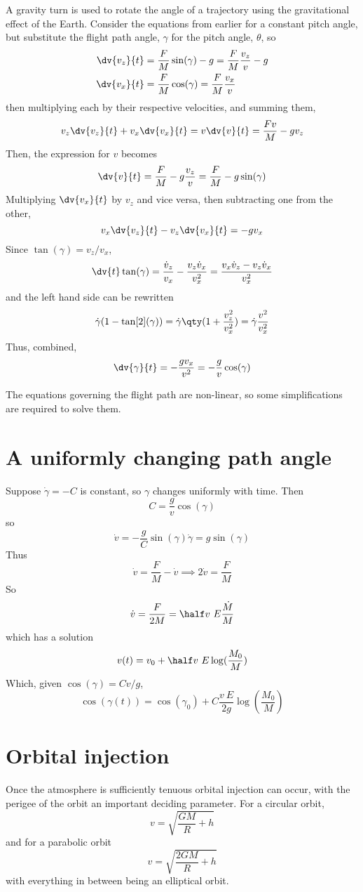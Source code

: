 A gravity turn is used to rotate the angle of a trajectory using the
gravitational effect of the Earth. Consider the equations from earlier for a constant pitch angle, but substitute the flight path angle, $\gamma$ for the pitch angle, $\theta$, so
\begin{align*}
  \dv{v_z}{t} &= \frac{F}{M} \sin(\gamma) - g = \frac{F}{M} \frac{v_z}{v} -g \\
\dv{v_x}{t} &= \frac{F}{M} \cos(\gamma) =\frac{F}{M} \frac{v_x}{v}
\end{align*}
then multiplying each by their respective velocities, and summing them,
\[ v_z \dv{v_z}{t} + v_x \dv{v_x}{t} = v \dv{v}{t} = \frac{F v}{M} - gv_z \]
Then, the expression for $v$ becomes
\[ \dv{v}{t} = \frac{F}{M} - g \frac{v_z}{v} = \frac{F}{M} - g \sin(\gamma) \]
Multiplying $\dv{v_x}{t}$ by $v_z$ and vice versa, then subtracting one from the other,
\[ v_x \dv{v_z}{t} - v_z \dv{v_x}{t} = - g v_x \]
Since $\tan(\gamma) = v_z / v_x$,
\[ \dv{t} \tan(\gamma) = \frac{\dot{v}_z}{v_x} - \frac{v_z \dot{v}_x}{v_x^2} = \frac{v_x \dot{v}_z - v_z \dot{v}_x}{v_x^2} \]
and the left hand side can be rewritten
\[ \dot{\gamma} (1-\tan[2](\gamma) ) = \dot{\gamma} \qty( 1+ \frac{v_z^2}{v_x^2} ) = \dot{\gamma} \frac{v^2}{v^2_x} \]
Thus, combined,
\[ \dv{\gamma}{t} = - \frac{g v_x}{v^2} = - \frac{g}{v} \cos(\gamma) \]

The equations governing the flight path are non-linear, so some
simplifications are required to solve them.

\section{A uniformly changing path angle}
\label{sec:unif-chang-path}

Suppose $\dot{\gamma} = -C$ is constant, so $\gamma$ changes uniformly
with time. Then
\[ C = \frac{g}{v} \cos(\gamma) \]
so
\[ \dot{v} = - \frac{g}{C} \sin(\gamma) \dot{\gamma} = g \sin(\gamma) \]
Thus
\[ \dot{v} = \frac{F}{M} - \dot{v} \implies 2 \dot{v} = \frac{F}{M} \]
So
\[ \dot{v} = \frac{F}{2M} = \half v~E \frac{\dot{M}}{M} \]
which has a solution
\[ v(t) = v_0 + \half v~E \log(\frac{M_0}{M}) \]
Which, given $\cos(\gamma) = Cv/g$,
\begin{equation}
  \label{eq:58}
  \cos(\gamma(t)) = \cos(\gamma_0) + C \frac{v~E}{2 g} \log(\frac{M_0}{M})
\end{equation}

\section{Orbital injection}
\label{sec:orbital-injection}

Once the atmosphere is sufficiently tenuous orbital injection can
occur, with the perigee of the orbit an important deciding parameter.
For a circular orbit,
\[ v = \sqrt{\frac{GM}{R}+h} \]
and for a parabolic orbit
\[ v = \sqrt{\frac{2GM}{R} + h} \] with everything in between being an
elliptical orbit.

